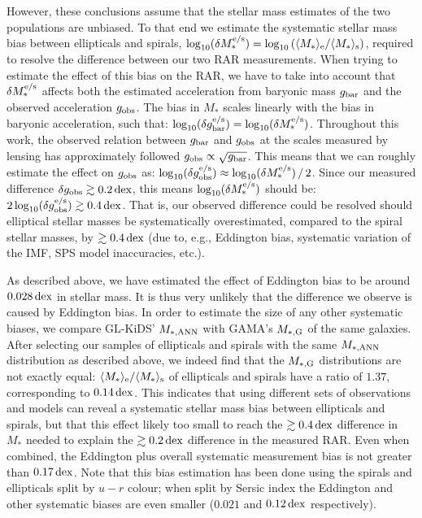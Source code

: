 \documentclass[usenatbib]{mnras}
\newcommand{\un}[1]{_{\rm #1}}
\newcommand{\dex}{\, {\rm dex}}
\begin{document}
However, these conclusions assume that the stellar mass estimates of the two populations are unbiased. To that end we estimate the systematic stellar mass bias between ellipticals and spirals, $\log_{10}(\delta M_*^{\rm e/s}) = \log_{10}\left( \langle M_*\rangle\un{e} / \langle M_*\rangle\un{s} \right)$, required to resolve the difference between our two RAR measurements. When trying to estimate the effect of this bias on the RAR, we have to take into account that $\delta M^{\rm e/s}_*$ affects both the estimated acceleration from baryonic mass $g\un{bar}$ and the observed acceleration $g\un{obs}$. The bias in $M_*$ scales linearly with the bias in baryonic acceleration, such that: $\log_{10}(\delta g^{\rm e/s}\un{bar}) = \log_{10}(\delta M^{\rm e/s}_*)$. Throughout this work, the observed relation between $g\un{bar}$ and $g\un{obs}$ at the scales measured by lensing has approximately followed $g\un{obs} \propto \sqrt{g\un{bar}}$. This means that we can roughly estimate the effect on $g\un{obs}$ as: $\log_{10}(\delta g^{\rm e/s}\un{obs}) \approx {\log_{10}(\delta M^{\rm e/s}_*)} \, / \, {2}$. Since our measured difference $\delta g\un{obs} \gtrsim 0.2 \dex$, this means ${\log_{10}(\delta M^{\rm e/s}_*)}$ should be: $2 \log_{10}(\delta g^{\rm e/s}\un{obs}) \gtrsim 0.4 \dex$. That is, our observed difference could be resolved should elliptical stellar masses be systematically overestimated, compared to the spiral stellar masses, by $\gtrsim 0.4 \dex$ (due to, e.g., Eddington bias, systematic variation of the IMF, SPS model inaccuracies, etc.).

As described above, we have estimated the effect of Eddington bias to be around $0.028 \dex$ in stellar mass. It is thus very unlikely that the difference we observe is caused by Eddington bias. In order to estimate the size of any other systematic biases, we compare GL-KiDS' $M\un{*,ANN}$ with GAMA's $M\un{*,G}$ of the same galaxies. After selecting our samples of ellipticals and spirals with the same $M\un{*,ANN}$ distribution as described above, we indeed find that the $M\un{*,G}$ distributions are not exactly equal: $\langle M_* \rangle\un{e} / \langle M_*\rangle\un{s}$ of ellipticals and spirals have a ratio of $1.37$, corresponding to $0.14 \dex$. This indicates that using different sets of observations and models can reveal a systematic stellar mass bias between ellipticals and spirals, but that this effect likely too small to reach the $\gtrsim 0.4 \dex$ difference in $M_*$ needed to explain the $\gtrsim 0.2 \dex$ difference in the measured RAR. Even when combined, the Eddington plus overall systematic measurement bias is not greater than $0.17 \dex$. Note that this bias estimation has been done using the spirals and ellipticals split by $u-r$ colour; when split by Sersic index the Eddington and other systematic biases are even smaller ($0.021$ and $0.12 \dex$ respectively).
\end{document}
